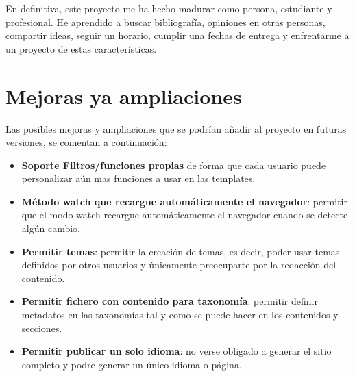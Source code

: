 En definitiva, este proyecto me ha hecho madurar como persona, estudiante y profesional. He aprendido a buscar
bibliografía, opiniones en otras personas, compartir ideas, seguir un horario, cumplir una fechas de
entrega y enfrentarme a un proyecto de estas características.

\section{Mejoras ya ampliaciones}

Las posibles mejoras y ampliaciones que se podrían añadir al proyecto en futuras versiones, se comentan
a continuación:

\begin{itemize}
    \item \textbf{Soporte Filtros/funciones propias} de forma que cada usuario puede personalizar aún mas
    funciones a usar en las templates.
    \item \textbf{Método watch que recargue automáticamente el navegador}: permitir que el modo watch recargue
    automáticamente el navegador cuando se detecte algún cambio.
    \item \textbf{Permitir temas}: permitir la creación de temas, es decir, poder usar temas definidos
    por otros usuarios y únicamente preocuparte por la redacción del contenido.
    \item \textbf{Permitir fichero con contenido para taxonomía}: permitir definir metadatos en las taxonomías
    tal y como se puede hacer en los contenidos y secciones.
    \item \textbf{Permitir publicar un solo idioma}: no verse obligado a generar el sitio completo y podre generar
    un único idioma o página.
\end{itemize}
